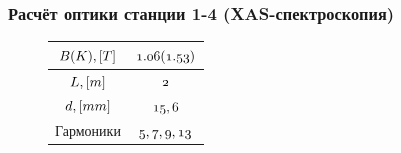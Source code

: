 \documentclass[14pt, hyperref = {colorlinks}]{beamer}
\begin{document}
\begin{frame}
\frametitle{Расчёт оптики станции 1-4 (XAS-спектроскопия)}\label{t1}
\begin{figure}[h]
	\begin{minipage}[h]{0.49\linewidth}
		\tiny
		\vspace{-15pt}
		\begin{table}[h]
			\begin{tabular}{c|c}
				\hline\hline
				\rule{0pt}{3ex}$\mathnormal{B(K), [T]}$   & $\mathnormal{1.06(1.53)}$   \\ \hline
				\rule{0pt}{3ex}$\mathnormal{L, [m]}$ 	  & $\mathnormal{2}$          \\ \hline
				\rule{0pt}{3ex}$\mathnormal{d, [mm]}$     & $\mathnormal{15,6}$    		\\ \hline
				\rule{0pt}{3ex}Гармоники	              & $\mathnormal{5, 7, 9, 13}$  \\
				\hline\hline
			\end{tabular}
		\end{table}
		\vspace{-25pt}
		\tiny{}
	\end{minipage}
	\begin{minipage}[h]{0.49\linewidth}
		\vspace{-10pt}
		\vspace{-15pt}
		\tiny{}
	\end{minipage}
\end{figure}
\begin{figure}[h]
	\vspace{-15pt}
\end{figure}

\end{frame}
\end{document}
